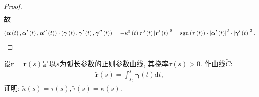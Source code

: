 \documentclass[../../main.tex]{subfiles}%
\begin{document}
\begin{proof}
\begin{align*}
\end{align*}
故
\begin{align*}
\left(\bm{\alpha}\left(t\right),\bm{\alpha}^\prime\left(t\right),\bm{\alpha}^{\prime\prime}\left(t\right)\right)\cdot\left(\bm{\gamma}\left(t\right),\bm{\gamma}^\prime\left(t\right),\bm{\gamma}^{\prime\prime}\left(t\right)\right)=-\kappa^3\left(t\right)\tau^3\left(t\right)\left|\bm{r}^\prime\left(t\right)\right|^6=\operatorname{sgn}\left(\tau\left(t\right)\right)\cdot\left|\bm{\alpha}^\prime\left(t\right)\right|^3\cdot\left|\bm{\gamma}^\prime\left(t\right)\right|^3.
\end{align*}
\end{proof}

\begin{example}
设$\bm{r} = \bm{r}(s)$是以$s$为弧长参数的正则参数曲线, 其挠率$\tau(s) > 0$. 作曲线$\tilde{C}$:
\begin{align*}
\tilde{\bm{r}}(s) = \int_{s_0}^{s} \bm{\gamma}(t)\mathrm{d}t,
\end{align*}
证明: $\tilde{\kappa}(s) = \tau(s), \tilde{\tau}(s) = \kappa(s)$.
\end{example}
\end{document}
